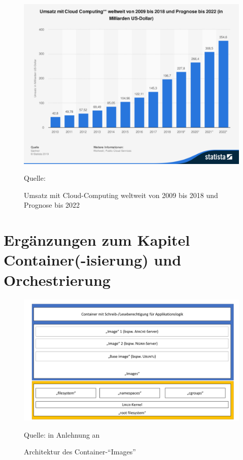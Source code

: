 \begin{figure}[H]
	\centering
	\includegraphics[scale=0.43]{img/statistic_id195760_prognose-zum-umsatz-mit-cloud-computing-weltweit-bis-2022.pdf}
	\caption{Umsatz mit Cloud-Computing weltweit von 2009 bis 2018 und Prognose bis 2022 }
	{\footnotesize Quelle: \cite{gartner_cloud_2019}}
	\label{abb:umsatzprognoseCC}
\end{figure}

\section{Ergänzungen zum Kapitel Container(-isierung) und Orchestrierung}

\begin{figure}[H]
	\centering
	\includegraphics[scale=0.45]{img/containerImageArch.pdf}
	\caption{Architektur des Container-\enquote{Images}}
	{\footnotesize Quelle: in Anlehnung an \cite{pahl_containerization_2015}}
	\label{abb:containerArch}
\end{figure}


